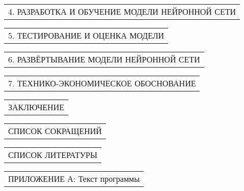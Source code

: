 \documentclass[12pt, А4, twoside]{article}
\begin{document}
\begin{FlushLeft}
    \begin{tabular}{p{17.25cm}} 
        \hspace{0.3cm} \textsf{4. РАЗРАБОТКА И ОБУЧЕНИЕ МОДЕЛИ НЕЙРОННОЙ СЕТИ} \vspace{1pt} \hline \\
    \end{tabular}  

    \begin{tabular}{p{17.25cm}} 
        \hspace{0.3cm} \textsf{5. ТЕСТИРОВАНИЕ И ОЦЕНКА МОДЕЛИ} \vspace{1pt} \hline \\
    \end{tabular} 

    \begin{tabular}{p{17.25cm}} 
        \hspace{0.3cm} \textsf{6. РАЗВЁРТЫВАНИЕ МОДЕЛИ НЕЙРОННОЙ СЕТИ} \vspace{1pt} \hline \\
    \end{tabular}  

    \begin{tabular}{p{17.25cm}} 
        \hspace{0.3cm} \textsf{7. ТЕХНИКО-ЭКОНОМИЧЕСКОЕ ОБОСНОВАНИЕ} \vspace{2pt} \hline \\
    \end{tabular}  

    \begin{tabular}{p{17.25cm}} 
        \textsf{ЗАКЛЮЧЕНИЕ} \vspace{2pt} \hline \\
    \end{tabular}  

    \begin{tabular}{p{17.25cm}} 
        \textsf{СПИСОК СОКРАЩЕНИЙ} \vspace{1pt} \hline \\
    \end{tabular}  

    \begin{tabular}{p{17.25cm}} 
        \textsf{СПИСОК ЛИТЕРАТУРЫ} \vspace{2pt} \hline  \\
    \end{tabular}  

    \begin{tabular}{p{17.25cm}} 
        \textsf{ПРИЛОЖЕНИЕ А: Текст программы} \vspace{2pt} \hline  \\
    \end{tabular}  


\end{FlushLeft}
\end{document}
